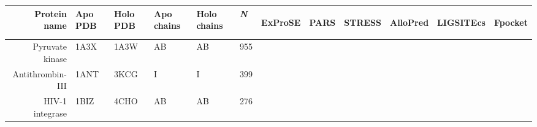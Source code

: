 \begin{table}
\centering

\begin{scriptsize}
\begin{tabular}{ r p{0.8cm} p{0.8cm} p{0.8cm} p{0.8cm} r r r r r r r }
\hline
\multicolumn{1}{r}{\textbf{Protein name}} & \textbf{Apo PDB} & \textbf{Holo PDB} & \textbf{Apo chains} & \textbf{Holo chains} & \multicolumn{1}{l}{\textit{\textbf{N}}} & \multicolumn{1}{l}{\begin{sideways}\textbf{ExProSE}\end{sideways}} & \multicolumn{1}{l}{\begin{sideways}\textbf{PARS}\end{sideways}} & \multicolumn{1}{l}{\begin{sideways}\textbf{STRESS}\end{sideways}} & \multicolumn{1}{l}{\begin{sideways}\textbf{AlloPred}\end{sideways}} & \multicolumn{1}{l}{\begin{sideways}\textbf{LIGSITEcs}\end{sideways}} & \multicolumn{1}{l}{\begin{sideways}\textbf{Fpocket}\end{sideways}} \\
\hline
\multicolumn{1}{r}{Pyruvate kinase} & \multicolumn{1}{l}{1A3X} & \multicolumn{1}{l}{1A3W} & \multicolumn{1}{l}{AB} & \multicolumn{1}{l}{AB} & 955   & \cellcolor[rgb]{ .573,  .816,  .314}  & \cellcolor[rgb]{ .573,  .816,  .314}  & \cellcolor[rgb]{ 1,  .494,  .475}  & \cellcolor[rgb]{ 1,  .494,  .475}  & \cellcolor[rgb]{ 1,  .494,  .475}  & \cellcolor[rgb]{ .573,  .816,  .314}  \\
\multicolumn{1}{r}{Antithrombin-III} & \multicolumn{1}{l}{1ANT} & \multicolumn{1}{l}{3KCG} & \multicolumn{1}{l}{I} & \multicolumn{1}{l}{I} & 399   & \cellcolor[rgb]{ 1,  .494,  .475}  & \cellcolor[rgb]{ 1,  .494,  .475}  & \cellcolor[rgb]{ 1,  .494,  .475}  & \cellcolor[rgb]{ 1,  .494,  .475}  & \cellcolor[rgb]{ 1,  .494,  .475}  & \cellcolor[rgb]{ 1,  .494,  .475}  \\
\multicolumn{1}{r}{HIV-1 integrase} & \multicolumn{1}{l}{1BIZ} & \multicolumn{1}{l}{4CHO} & \multicolumn{1}{l}{AB} & \multicolumn{1}{l}{AB} & 276   & \cellcolor[rgb]{ 1,  .494,  .475}  & \cellcolor[rgb]{ .573,  .816,  .314}  & \cellcolor[rgb]{ 1,  .494,  .475}  & \cellcolor[rgb]{ 1,  .494,  .475}  & \cellcolor[rgb]{ 1,  .494,  .475}  & \cellcolor[rgb]{ 1,  .494,  .475}  \\

\end{tabular}
\end{scriptsize}
\end{table}
